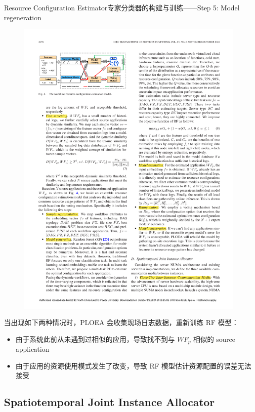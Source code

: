 \documentclass[aspectratio=169]{beamer}
\begin{document}
\begin{frame}{Resource Configuration Estimator}{专家分类器的构建与训练——Step 5: Model regeneration}
  \begin{figure}
    \centering
    \includegraphics[height=0.4\textheight]{img/method/resource-configuration-estimation-model.pdf}
  \end{figure}
  当出现如下两种情况时，PLOEA 会收集现场日志数据，重新训练 RF 模型：
  \begin{itemize}
    \item 由于系统此前从未遇到过相似的应用，导致找不到与 $WF_p$ 相似的 source application
    \item 由于应用的资源使用模式发生了改变，导致 RF 模型估计资源配置的误差无法接受
  \end{itemize}
\end{frame}

\subsection{Spatiotemporal Joint Instance Allocator}
\end{document}
